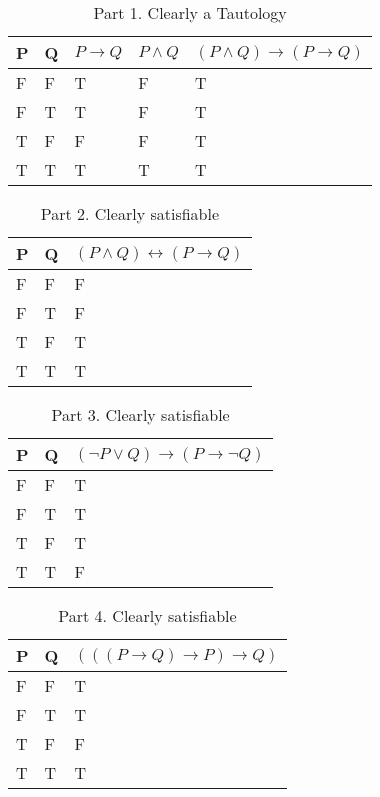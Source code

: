 \documentclass[10.5pt]{article}
\newenvironment{solution}[2][Solution]{ \begin{trivlist}
\item[\hskip \labelsep {\bfseries #1}]}{\end{trivlist}}
\begin{document}
\begin{solution}{2}
\item[]
\begin{table}[!h]
\centering
\caption{Part 1. Clearly a Tautology}
\label{my-label}
\begin{tabular}{|l|l|l|l|l|}
\hline
P & Q & $P \rightarrow Q$ & $P \wedge Q$ & $(P \wedge Q) \rightarrow (P \rightarrow Q)$ \\ \hline
F & F & T               & F          & T                                          \\ \hline
F & T & T               & F          & T                                          \\ \hline
T & F & F               & F          & T                                          \\ \hline
T & T & T               & T          & T                                          \\ \hline
\end{tabular}
\end{table}

\begin{table}[!h]
\centering
\caption{Part 2. Clearly satisfiable}
\label{my-label}
\begin{tabular}{|l|l|l|}
\hline
P & Q & $(P \wedge Q) \leftrightarrow (P \rightarrow Q)$ \\ \hline
F & F & F \\ \hline
F & T & F \\ \hline
T & F & T \\ \hline
T & T & T \\ \hline
\end{tabular}
\end{table}

\begin{table}[!h]
\centering
\caption{Part 3. Clearly satisfiable}
\label{my-label}
\begin{tabular}{|l|l|l|}
\hline
P & Q & $(\lnot P \vee Q) \rightarrow (P \rightarrow \lnot Q)$ \\ \hline
F & F & T \\ \hline
F & T & T \\ \hline
T & F & T \\ \hline
T & T & F \\ \hline
\end{tabular}
\end{table}

\begin{table}[!h]
\centering
\caption{Part 4. Clearly satisfiable}
\label{my-label}
\begin{tabular}{|l|l|l|}
\hline
P & Q & $(((P \rightarrow Q) \rightarrow P) \rightarrow Q)$ \\ \hline
F & F & T \\ \hline
F & T & T \\ \hline
T & F & F \\ \hline
T & T & T \\ \hline
\end{tabular}
\end{table}


\end{solution}
\end{document}
